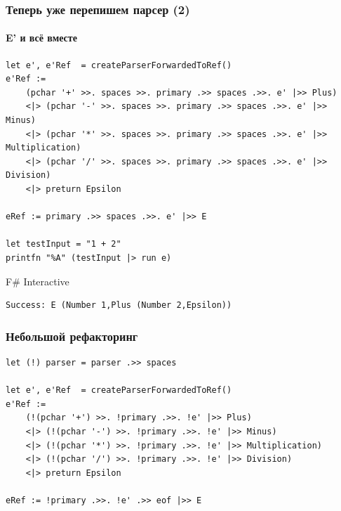 \documentclass[xetex,mathserif,serif]{beamer}
\begin{document}
    \begin{frame}[fragile]
        \frametitle{Теперь уже перепишем парсер (2)}
        \framesubtitle{E' и всё вместе}
        \begin{small}
            \begin{verbatim}
let e', e'Ref  = createParserForwardedToRef()
e'Ref := 
    (pchar '+' >>. spaces >>. primary .>> spaces .>>. e' |>> Plus)
    <|> (pchar '-' >>. spaces >>. primary .>> spaces .>>. e' |>> Minus)
    <|> (pchar '*' >>. spaces >>. primary .>> spaces .>>. e' |>> Multiplication)
    <|> (pchar '/' >>. spaces >>. primary .>> spaces .>>. e' |>> Division)
    <|> preturn Epsilon

eRef := primary .>> spaces .>>. e' |>> E

let testInput = "1 + 2"
printfn "%A" (testInput |> run e)
            \end{verbatim}

            \begin{exampleblock}{F\# Interactive}
                \begin{verbatim}
Success: E (Number 1,Plus (Number 2,Epsilon))
                \end{verbatim}
            \end{exampleblock}
        \end{small}
    \end{frame}

    \begin{frame}[fragile]
        \frametitle{Небольшой рефакторинг}
        \begin{verbatim}
let (!) parser = parser .>> spaces

let e', e'Ref  = createParserForwardedToRef()
e'Ref := 
    (!(pchar '+') >>. !primary .>>. !e' |>> Plus)
    <|> (!(pchar '-') >>. !primary .>>. !e' |>> Minus)
    <|> (!(pchar '*') >>. !primary .>>. !e' |>> Multiplication)
    <|> (!(pchar '/') >>. !primary .>>. !e' |>> Division)
    <|> preturn Epsilon

eRef := !primary .>>. !e' .>> eof |>> E
        \end{verbatim}
    \end{frame}
\end{document}
